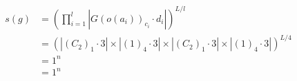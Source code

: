 \documentclass[preview]{standalone}
\begin{document}
\begin{align*}
s(g) &= \left(\prod_{i=1}^{l}\left|G(o(a_i))_{c_i}\cdot d_i\right|\right)^{L/l} \\   &= \left(\left|(C_2)_1\cdot 3\right| \times \left|(1)_4\cdot 3\right|\times \left|(C_2)_1\cdot 3\right| \times \left|(1)_4\cdot 3\right|\right)^{L/4} \\   &= 1^{n}\phantom{teee} \\   &= 1^{n}\phantom{teee}
\end{align*}
\end{document}

